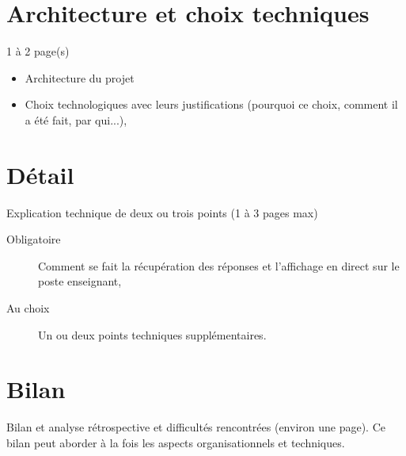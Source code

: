 \documentclass[a4paper, 12pt]{article}
\begin{document}
\section{Architecture et choix techniques}

1 à 2 page(s) 
\begin{itemize}
\item Architecture du projet
\item Choix technologiques  avec leurs justifications (pourquoi ce choix, comment il a été fait, par qui...),
\end{itemize}

    
\section{Détail}

Explication technique de deux ou trois points (1 à 3 pages max)
\begin{description}
\item[Obligatoire] Comment se fait la récupération des réponses et l'affichage en direct sur le poste enseignant,
\item[Au choix] Un ou deux  points techniques supplémentaires.  
\end{description}

\section{Bilan}

Bilan et analyse rétrospective et difficultés rencontrées (environ une page). Ce bilan peut aborder à la fois les aspects organisationnels et techniques.

    
\end{document}
